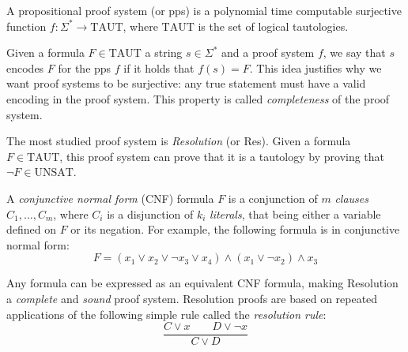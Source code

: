 \begin{definition}
 A propositional proof system (or pps) is a polynomial time computable surjective function $f : \Sigma^* \to \mathrm{TAUT}$, where $\mathrm{TAUT}$ is the set of logical tautologies.
\end{definition}

Given a formula $F \in \mathrm{TAUT}$ a string $s \in \Sigma^*$ and a proof system $f$, we say that $s$ encodes $F$ for the pps $f$ if it holds that $f(s) = F$. This idea justifies why we want proof systems to be surjective: any true statement must have a valid encoding in the proof system. This property is called \textit{completeness} of the proof system.

The most studied proof system is \textit{Resolution} (or \textsf{Res}). Given a formula $F \in \mathrm{TAUT}$, this proof system can prove that it is a tautology by proving that $\lnot F \in \mathrm{UNSAT}$.

A \textit{conjunctive normal form} (CNF) formula $F$ is a conjunction of $m$ \textit{clauses} $C_1, \ldots, C_m$, where $C_i$ is a disjunction of $k_i$ \textit{literals}, that being either a variable defined on $F$ or its negation. For example, the following formula is in conjunctive normal form:
\[F = (x_1 \lor x_2 \lor \lnot{x_3} \lor x_4) \land (x_1 \lor \lnot{x_2}) \land x_3\]

Any formula can be expressed as an equivalent CNF formula, making Resolution a \textit{complete} and \textit{sound} proof system. Resolution proofs are based on repeated applications of the following simple rule called the \textit{resolution rule}:
\[\dfrac{C \lor x \qquad D \lor \lnot x}{C \lor D}\]

